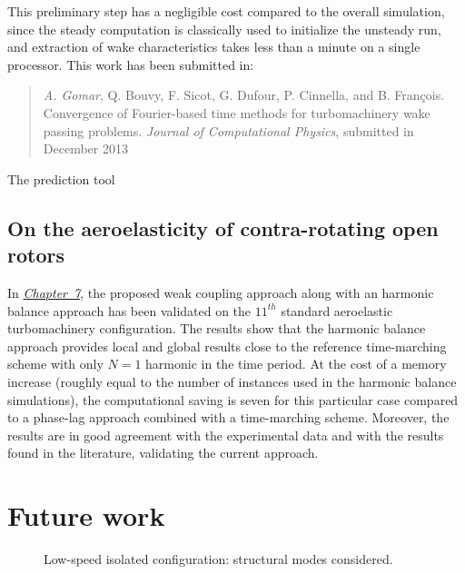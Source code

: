 This preliminary step has a negligible cost compared to the overall 
simulation, since the steady computation is classically used to initialize 
the unsteady run, and extraction of wake characteristics takes 
less than a minute on a single processor. 
This work has been submitted in:
\begin{quote}
	{\small \emph{A. Gomar}, Q. Bouvy, F. Sicot, G. Dufour, P. Cinnella, and B. Fran\c cois. Convergence of Fourier-based time methods for turbomachinery wake passing problems. 
	\emph{Journal of Computational Physics}, submitted in December 2013}
\end{quote}

The prediction tool

\subsection*{On the aeroelasticity of contra-rotating open rotors}

In \hyperref[cha:stcf11]{\emph{Chapter~7}}, 
the proposed weak coupling approach along with
an harmonic balance approach has been
validated on the $11^{th}$ standard aeroelastic turbomachinery
configuration.
The results show that the harmonic balance approach provides local
and global results close to the reference time-marching scheme 
with only $N=1$ harmonic in the time period. At the cost of a memory
increase (roughly equal to the number of instances used in the harmonic balance
simulations), the computational saving is seven for this
particular case compared to a phase-lag approach combined
with a time-marching scheme. Moreover, the results are
in good agreement with the experimental data and with the results
found in the literature, validating the current approach.






\section*{Future work}

\begin{figure}[htp]
  \centering
  \caption{Low-speed isolated configuration: structural modes considered.}
  \label{fig:hera3_perspectives}
\end{figure}
